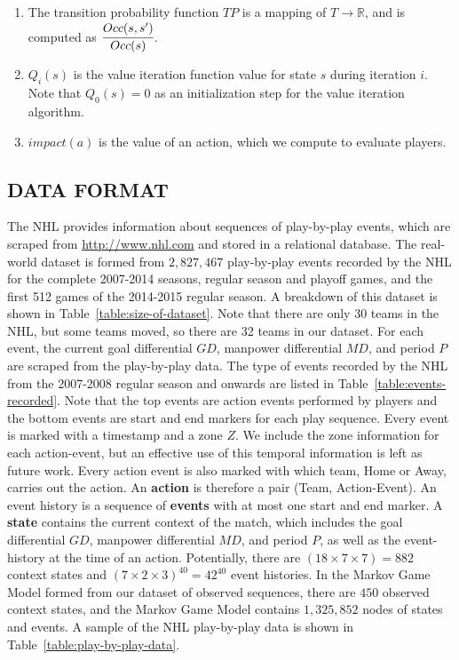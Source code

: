 \documentclass[]{article}
\begin{document}
\begin{enumerate}
\item The transition probability function $TP$ is a mapping of $T \rightarrow \mathbb{R}$, and is computed as $\cfrac{Occ(s,s')}{Occ(s)}$.
\item $Q_{i}(s)$ is the value iteration function value for state $s$ during iteration $i$. Note that $Q_{0}(s) = 0$ as an initialization step for the value iteration algorithm.
\item $impact(a)$ is the value of an action, which we compute to evaluate players.
\end{enumerate}


\subsection{DATA FORMAT}

The NHL provides information about sequences of play-by-play events, which are scraped from \url{http://www.nhl.com} and stored in a relational database. The real-world dataset is formed from $2,827,467$ play-by-play events recorded by the NHL for the complete 2007-2014 seasons, regular season and playoff games, and the first 512 games of the 2014-2015 regular season. A breakdown of this dataset is shown in Table~\ref{table:size-of-dataset}. Note that there are only 30 teams in the NHL, but some teams moved, so there are 32 teams in our dataset. For each event, the current goal differential $GD$, manpower differential $MD$, and period $P$ are scraped from the play-by-play data. The type of events recorded by the NHL from the 2007-2008 regular season and onwards are listed in Table~\ref{table:events-recorded}. Note that the top events are action events performed by players and the bottom events are start and end markers for each play sequence. Every event is marked with a timestamp and a zone $Z$. We include the zone information for each action-event, but an effective use of this temporal information is left as future work. Every action event is also marked with which team, Home or Away, carries out the action. An \textbf{action} is therefore a pair (Team, Action-Event). An event history is a sequence of \textbf{events} with at most one start and end marker. A \textbf{state} contains the current context of the match, which includes the goal differential $GD$, manpower differential $MD$, and period $P$, as well as the event-history at the time of an action. Potentially, there are $(18 \times 7 \times 7) = 882$ context states and $(7 \times 2 \times 3)^{40} = 42^{40}$ event histories. In the Markov Game Model formed from our dataset of observed sequences, there are $450$ observed context states, and the Markov Game Model contains $1,325,852$ nodes of states and events. A sample of the NHL play-by-play data is shown in Table~\ref{table:play-by-play-data}.
\end{document}
